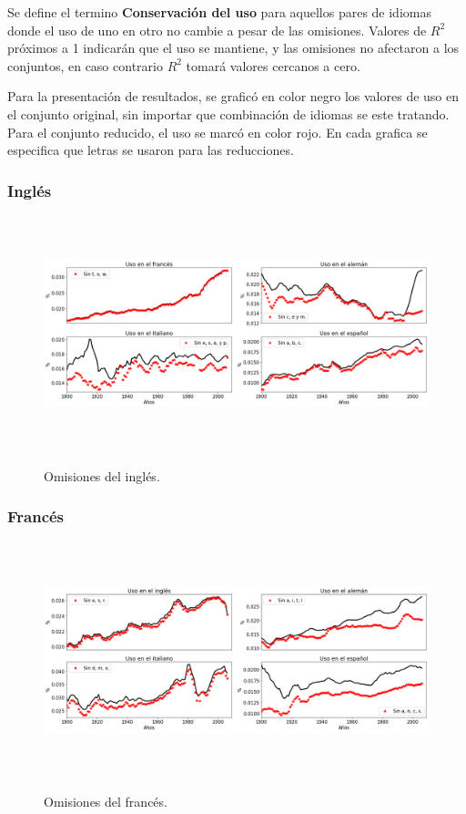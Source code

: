 Se define el termino \textbf{Conservación del uso} para aquellos pares de idiomas donde el uso de uno en otro no cambie a pesar de las omisiones. Valores de $R^{2}$  próximos a 1 indicarán que el uso se mantiene, y las omisiones no afectaron a los conjuntos, en caso contrario $R^{2}$ tomará valores cercanos a cero.  

Para la presentación de resultados, se graficó en color negro los valores de uso en el conjunto original, sin importar que combinación de idiomas se este tratando.  Para el conjunto reducido, el uso se marcó en color rojo.  En cada grafica se especifica que letras se usaron para las reducciones. 

\newpage

\subsubsection*{Inglés}

\begin{figure}[h!]
	\centering
	\includegraphics[width=14.5cm, height=6.8cm]{Cap_5/OM_EN.png}
	\label{fig.OM_EN}
	\caption{Omisiones del inglés.}
\end{figure}


\subsubsection*{Francés}

\begin{figure}[h!]
	\centering
	\includegraphics[width=14.5cm, height=6.8cm]{Cap_5/OM_FR.png}
	\label{fig.OM_FR}
	\caption{Omisiones del francés.}
\end{figure}


